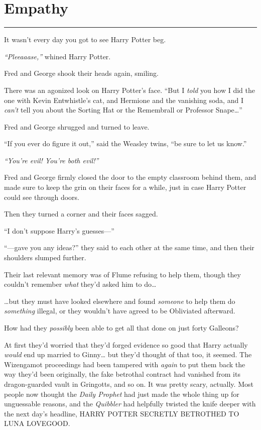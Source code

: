 \chapter{Empathy}

\begin{center}\rule{3in}{0.4pt}\end{center}

It wasn't every day you got to see Harry Potter beg.

\emph{``Pleeaaase,''} whined Harry Potter.

Fred and George shook their heads again, smiling.

There was an agonized look on Harry Potter's face. ``But I \emph{told}
you how I did the one with Kevin Entwhistle's cat, and Hermione and the
vanishing soda, and I \emph{can't} tell you about the Sorting Hat or the
Remembrall or Professor Snape\ldots{}''

Fred and George shrugged and turned to leave.

``If you ever do figure it out,'' said the Weasley twins, ``be sure to
let us know.''

\emph{``You're evil! You're both evil!''}

Fred and George firmly closed the door to the empty classroom behind
them, and made sure to keep the grin on their faces for a while, just in
case Harry Potter could see through doors.

Then they turned a corner and their faces sagged.

``I don't suppose Harry's guesses---''

``---gave you any ideas?'' they said to each other at the same time, and
then their shoulders slumped further.

Their last relevant memory was of Flume refusing to help them, though
they couldn't remember \emph{what} they'd asked him to do\ldots{}

\ldots{}but they must have looked elsewhere and found \emph{someone} to
help them do \emph{something} illegal, or they wouldn't have agreed to
be Obliviated afterward.

How had they \emph{possibly} been able to get all that done on just
forty Galleons?

At first they'd worried that they'd forged evidence so good that Harry
actually \emph{would} end up married to Ginny\ldots{} but they'd thought
of that too, it seemed. The Wizengamot proceedings had been tampered
with \emph{again} to put them back the way they'd been originally, the
fake betrothal contract had vanished from its dragon-guarded vault in
Gringotts, and so on. It was pretty scary, actually. Most people now
thought the \emph{Daily Prophet} had just made the whole thing up for
unguessable reasons, and the \emph{Quibbler} had helpfully twisted the
knife deeper with the next day's headline, HARRY POTTER SECRETLY
BETROTHED TO LUNA LOVEGOOD.

